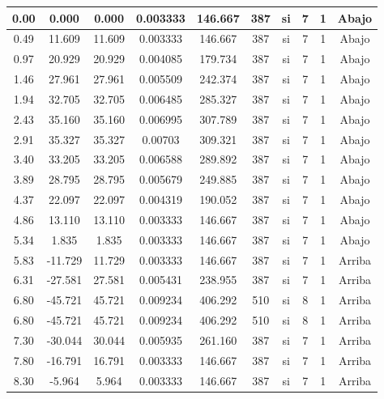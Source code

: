 \begin{table}[H]
{\begin{tabular}{|c|c|c|c|c|c|c|c|c|c|}
    0.00 & 0.000 & 0.000 & 0.003333 & 146.667 & 387 & si  & 7   & 1   & Abajo \bigstrut\\
    \hline
    0.49 & 11.609 & 11.609 & 0.003333 & 146.667 & 387 & si  & 7   & 1   & Abajo \bigstrut\\
    \hline
    0.97 & 20.929 & 20.929 & 0.004085 & 179.734 & 387 & si  & 7   & 1   & Abajo \bigstrut\\
    \hline
    1.46 & 27.961 & 27.961 & 0.005509 & 242.374 & 387 & si  & 7   & 1   & Abajo \bigstrut\\
    \hline
    1.94 & 32.705 & 32.705 & 0.006485 & 285.327 & 387 & si  & 7   & 1   & Abajo \bigstrut\\
    \hline
    2.43 & 35.160 & 35.160 & 0.006995 & 307.789 & 387 & si  & 7   & 1   & Abajo \bigstrut\\
    \hline
    2.91 & 35.327 & 35.327 & 0.00703 & 309.321 & 387 & si  & 7   & 1   & Abajo \bigstrut\\
    \hline
    3.40 & 33.205 & 33.205 & 0.006588 & 289.892 & 387 & si  & 7   & 1   & Abajo \bigstrut\\
    \hline
    3.89 & 28.795 & 28.795 & 0.005679 & 249.885 & 387 & si  & 7   & 1   & Abajo \bigstrut\\
    \hline
    4.37 & 22.097 & 22.097 & 0.004319 & 190.052 & 387 & si  & 7   & 1   & Abajo \bigstrut\\
    \hline
    4.86 & 13.110 & 13.110 & 0.003333 & 146.667 & 387 & si  & 7   & 1   & Abajo \bigstrut\\
    \hline
    5.34 & 1.835 & 1.835 & 0.003333 & 146.667 & 387 & si  & 7   & 1   & Abajo \bigstrut\\
    \hline
    5.83 & -11.729 & 11.729 & 0.003333 & 146.667 & 387 & si  & 7   & 1   & Arriba \bigstrut\\
    \hline
    6.31 & -27.581 & 27.581 & 0.005431 & 238.955 & 387 & si  & 7   & 1   & Arriba \bigstrut\\
    \hline
    6.80 & -45.721 & 45.721 & 0.009234 & 406.292 & 510 & si  & 8   & 1   & Arriba \bigstrut\\
    \hline
    6.80 & -45.721 & 45.721 & 0.009234 & 406.292 & 510 & si  & 8   & 1   & Arriba \bigstrut\\
    \hline
    7.30 & -30.044 & 30.044 & 0.005935 & 261.160 & 387 & si  & 7   & 1   & Arriba \bigstrut\\
    \hline
    7.80 & -16.791 & 16.791 & 0.003333 & 146.667 & 387 & si  & 7   & 1   & Arriba \bigstrut\\
    \hline
    8.30 & -5.964 & 5.964 & 0.003333 & 146.667 & 387 & si  & 7   & 1   & Arriba \bigstrut\\

\end{tabular}}
\end{table}
